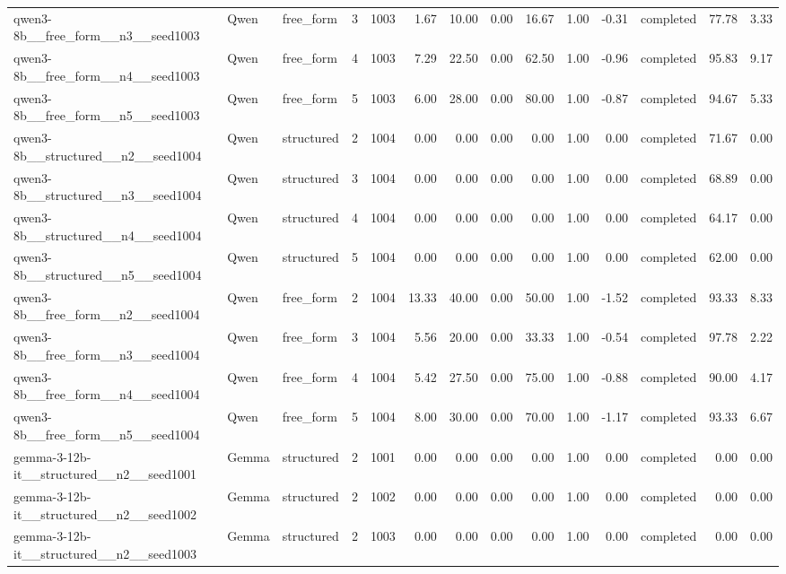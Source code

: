 \begin{longtable}{lllrrrrrrrrlrr}
qwen3-8b\_\_free\_form\_\_n3\_\_seed1003 & Qwen & free\_form & 3 & 1003 & 1.67 & 10.00 & 0.00 & 16.67 & 1.00 & -0.31 & completed & 77.78 & 3.33 \\
qwen3-8b\_\_free\_form\_\_n4\_\_seed1003 & Qwen & free\_form & 4 & 1003 & 7.29 & 22.50 & 0.00 & 62.50 & 1.00 & -0.96 & completed & 95.83 & 9.17 \\
qwen3-8b\_\_free\_form\_\_n5\_\_seed1003 & Qwen & free\_form & 5 & 1003 & 6.00 & 28.00 & 0.00 & 80.00 & 1.00 & -0.87 & completed & 94.67 & 5.33 \\
qwen3-8b\_\_structured\_\_n2\_\_seed1004 & Qwen & structured & 2 & 1004 & 0.00 & 0.00 & 0.00 & 0.00 & 1.00 & 0.00 & completed & 71.67 & 0.00 \\
qwen3-8b\_\_structured\_\_n3\_\_seed1004 & Qwen & structured & 3 & 1004 & 0.00 & 0.00 & 0.00 & 0.00 & 1.00 & 0.00 & completed & 68.89 & 0.00 \\
qwen3-8b\_\_structured\_\_n4\_\_seed1004 & Qwen & structured & 4 & 1004 & 0.00 & 0.00 & 0.00 & 0.00 & 1.00 & 0.00 & completed & 64.17 & 0.00 \\
qwen3-8b\_\_structured\_\_n5\_\_seed1004 & Qwen & structured & 5 & 1004 & 0.00 & 0.00 & 0.00 & 0.00 & 1.00 & 0.00 & completed & 62.00 & 0.00 \\
qwen3-8b\_\_free\_form\_\_n2\_\_seed1004 & Qwen & free\_form & 2 & 1004 & 13.33 & 40.00 & 0.00 & 50.00 & 1.00 & -1.52 & completed & 93.33 & 8.33 \\
qwen3-8b\_\_free\_form\_\_n3\_\_seed1004 & Qwen & free\_form & 3 & 1004 & 5.56 & 20.00 & 0.00 & 33.33 & 1.00 & -0.54 & completed & 97.78 & 2.22 \\
qwen3-8b\_\_free\_form\_\_n4\_\_seed1004 & Qwen & free\_form & 4 & 1004 & 5.42 & 27.50 & 0.00 & 75.00 & 1.00 & -0.88 & completed & 90.00 & 4.17 \\
qwen3-8b\_\_free\_form\_\_n5\_\_seed1004 & Qwen & free\_form & 5 & 1004 & 8.00 & 30.00 & 0.00 & 70.00 & 1.00 & -1.17 & completed & 93.33 & 6.67 \\
gemma-3-12b-it\_\_structured\_\_n2\_\_seed1001 & Gemma & structured & 2 & 1001 & 0.00 & 0.00 & 0.00 & 0.00 & 1.00 & 0.00 & completed & 0.00 & 0.00 \\
gemma-3-12b-it\_\_structured\_\_n2\_\_seed1002 & Gemma & structured & 2 & 1002 & 0.00 & 0.00 & 0.00 & 0.00 & 1.00 & 0.00 & completed & 0.00 & 0.00 \\
gemma-3-12b-it\_\_structured\_\_n2\_\_seed1003 & Gemma & structured & 2 & 1003 & 0.00 & 0.00 & 0.00 & 0.00 & 1.00 & 0.00 & completed & 0.00 & 0.00 \\

\end{longtable}
